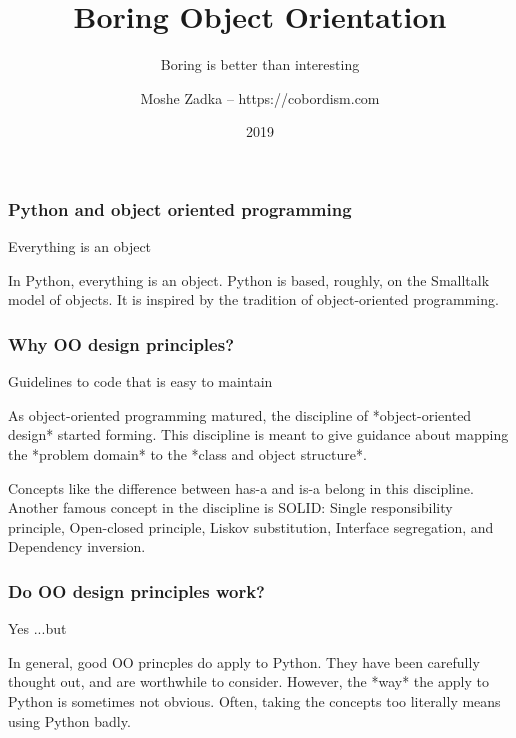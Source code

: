 \usepackage{listings}
\usepackage{textcomp}
\usepackage{fancyvrb}

\title{Boring Object Orientation}
\subtitle{Boring is better than interesting}
\author{Moshe Zadka -- https://cobordism.com}
\date{2019}


\begin{titlepage}
\maketitle
\end{titlepage}

\frame{\titlepage}

\begin{frame}[fragile]
\frametitle{Python and object oriented programming}

Everything is an object
\end{frame}

In Python,
everything is an object.
Python is based,
roughly,
on the Smalltalk model of objects.
It is inspired by the tradition of object-oriented programming.

\begin{frame}[fragile]
\frametitle{Why OO design principles?}

Guidelines to code that is easy to maintain
\end{frame}

As object-oriented programming matured,
the discipline of
*object-oriented design* started forming.
This discipline is meant to give guidance
about mapping the
*problem domain*
to the
*class and object structure*.

Concepts like the difference between
has-a
and
is-a
belong in this discipline.
Another famous concept in the discipline
is
SOLID:
Single responsibility principle,
Open-closed principle,
Liskov substitution,
Interface segregation,
and Dependency inversion.

\begin{frame}[fragile]
\frametitle{Do OO design principles work?}

Yes
\pause
...but
\end{frame}

In general,
good OO princples do apply to Python.
They have been carefully thought out,
and are worthwhile to consider.
However,
the
*way*
the apply to Python is sometimes not obvious.
Often,
taking the concepts too literally means
using Python badly.

